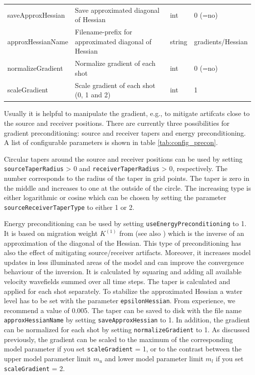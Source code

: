 \documentclass[pdftex,a4paper,parskip,listof=totoc,bibliography=totoc,onehalfspacing,12pt]{scrreprt}
\begin{document}
\begin{table}[h!]
\begin{adjustbox}{width=1\textwidth,center=\textwidth}
\begin{tabular}{llll}
         saveApproxHessian        & Save approximated diagonal of Hessian                               &  int   & 0 (=no) \\
         approxHessianName        & Filename-prefix for approximated diagonal of Hessian                   & string & gradients/Hessian \\
         normalizeGradient        & Normalize gradient of each shot                                     &  int   & 0 (=no) \\
         scaleGradient        & Scale gradient of each shot (0, 1 and 2)                                     &  int   & 1 \\
	\bottomrule
	\end{tabular}
	\end{adjustbox}
\end{table}
Usually it is helpful to manipulate the gradient, e.g., to mitigate artifcats close to the source and receiver positions. There are currently three possibilities for gradient preconditioning: source and receiver tapers and energy preconditioning. A list of configurable parameters is shown in table \ref{tab:config_precon}.

Circular tapers around the source and receiver positions can be used by setting \verb+sourceTaperRadius+ > 0 and \verb+receiverTaperRadius+ > 0, respectively. The number corresponds to the radius of the taper in grid points. The taper is zero in the middle and increases to one at the outside of the circle. The increasing type is either logarithmic or cosine which can be chosen by setting the parameter \verb+sourceReceiverTaperType+ to either 1 or 2.

Energy preconditioning can be used by setting \verb+useEnergyPreconditioning+ to 1. It is based on migration weight $K^{(1)}$ from \cite{plessix2004frequency} (see also \cite{shin2001improved}) which is the inverse of an approximation of the diagonal of the Hessian. This type of preconditioning has also the effect of mitigating source/receiver artifacts. Moreover, it increases model updates in less illuminated areas of the model and can improve the convergence behaviour of the inversion. It is calculated by squaring and adding all available velocity wavefields summed over all time steps. The taper is calculated and applied for each shot separately. To stabilize the approximated Hessian a water level has to be set with the parameter \verb+epsilonHessian+. From experience, we recommend a value of 0.005.
The taper can be saved to disk with the file name \verb+approxHessianName+ by setting \verb+saveApproxHessian+ to 1.
In addition, the gradient can be normalized for each shot by setting \verb+normalizeGradient+ to 1.
As discussed previously, the gradient can be scaled to the maximum of the corresponding model parameter if you set \verb+scaleGradient+ = 1, or to the contrast between the upper model parameter limit $m_u$ and lower model parameter limit $m_l$ if you set \verb+scaleGradient+ = 2.
\end{document}
